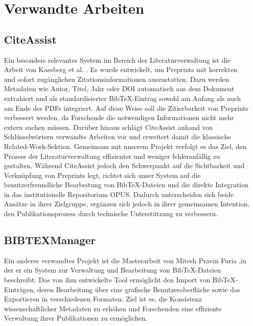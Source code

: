 \chapter{Verwandte Arbeiten}

\section{CiteAssist}
Ein besonders relevantes System im Bereich der Literaturverwaltung ist die Arbeit von  
Kaesberg et al. \cite{kaesberg2024citeassist}. 
Es wurde entwickelt, um Preprints mit korrekten und sofort 
zugänglichen Zitationsinformationen auszustatten. Dazu werden 
Metadaten wie Autor, Titel, Jahr oder DOI automatisch aus dem 
Dokument extrahiert und als standardisierter BibTeX-Eintrag 
sowohl am Anfang als auch am Ende des PDFs integriert. Auf 
diese Weise soll die Zitierbarkeit von Preprints verbessert 
werden, da Forschende die notwendigen Informationen nicht 
mehr extern suchen müssen. Darüber hinaus schlägt CiteAssist 
anhand von Schlüsselwörtern verwandte Arbeiten vor und 
erweitert damit die klassische Related-Work-Sektion. 
Gemeinsam mit unserem Projekt verfolgt es das Ziel, 
den Prozess der Literaturverwaltung effizienter und 
weniger fehleranfällig zu gestalten. Während CiteAssist 
jedoch den Schwerpunkt auf die Sichtbarkeit und Verknüpfung 
von Preprints legt, richtet sich unser System auf die 
benutzerfreundliche Bearbeitung von BibTeX-Dateien und 
die direkte Integration in das institutionelle Repositorium 
OPUS. Dadurch unterscheiden sich beide Ansätze in ihrer 
Zielgruppe, ergänzen sich jedoch in ihrer gemeinsamen Intention, 
den Publikationsprozess durch technische Unterstützung zu verbessern.

\section{BIBTEXManager}

Ein anderes  verwandtes Projekt ist die Masterarbeit von Mitesh Pravin Furia \cite{furia2009},in der er  ein 
System zur Verwaltung und Bearbeitung von Bib\TeX{}-Dateien beschreibt. 
Das von ihm  entwickelte Tool ermöglicht den Import von Bib\TeX{}-Einträgen, 
deren Bearbeitung über eine grafische Benutzeroberfläche sowie das Exportieren 
in verschiedenen Formaten. Ziel ist es, die Konsistenz wissenschaftlicher 
Metadaten zu erhöhen und Forschenden eine effiziente Verwaltung ihrer 
Publikationen zu ermöglichen. 

